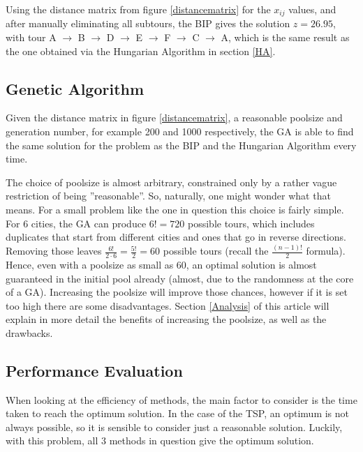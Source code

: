 Using the distance matrix from figure \ref{distancematrix} for the $x_{ij}$ values, and after manually eliminating all subtours, the BIP gives the solution $z=26.95$, with tour A $\rightarrow$ B $\rightarrow$ D $\rightarrow$ E $\rightarrow$ F $\rightarrow$ C $\rightarrow$ A, which is the same result as the one obtained via the Hungarian Algorithm in section \ref{HA}.
	
\subsection{Genetic Algorithm}	
	
Given the distance matrix in figure \ref{distancematrix}, a reasonable poolsize and generation number, for example 200 and 1000 respectively, the GA is able to find the same solution for the problem as the BIP and the Hungarian Algorithm every time.

The choice of poolsize is almost arbitrary, constrained only by a rather vague restriction of being ''reasonable''. So, naturally, one might wonder what that means. For a small problem like the one in question this choice is fairly simple. For 6 cities, the GA can produce $6!=720$ possible tours, which includes duplicates that start from different cities and ones that go in reverse directions. Removing those leaves $\frac{6!}{2\cdot{6}}=\frac{5!}{2}=60$ possible tours (recall the $\frac{(n-1)!}{2}$ formula). Hence, even with a poolsize as small as 60, an optimal solution is almost guaranteed in the initial pool already (almost, due to the randomness at the core of a GA). Increasing the poolsize will improve those chances, however if it is set too high there are some disadvantages. Section \ref{Analysis} of this article will explain in more detail the benefits of increasing the poolsize, as well as the drawbacks.

\subsection{Performance Evaluation}	
	
When looking at the efficiency of methods, the main factor to consider is the time taken to reach the optimum solution. In the case of the TSP, an optimum is not always possible, so it is sensible to consider just a reasonable solution. Luckily, with this problem, all 3 methods in question give the optimum solution.


